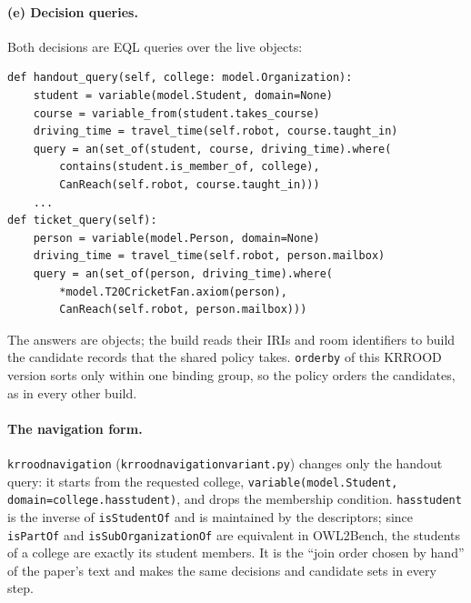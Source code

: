 \documentclass[10pt]{article}
\newcommand{\brkunderscore}{\textunderscore\allowbreak}
\newcommand{\code}[1]{{\let\_\brkunderscore\texttt{#1}}}
\newcommand{\file}[1]{{\let\_\brkunderscore\texttt{#1}}}
\begin{document}
\paragraph{(e) Decision queries.} Both decisions are EQL queries over the live objects:
\begin{lstlisting}[style=py]
def handout_query(self, college: model.Organization):
    student = variable(model.Student, domain=None)
    course = variable_from(student.takes_course)
    driving_time = travel_time(self.robot, course.taught_in)
    query = an(set_of(student, course, driving_time).where(
        contains(student.is_member_of, college),
        CanReach(self.robot, course.taught_in)))
    ...
def ticket_query(self):
    person = variable(model.Person, domain=None)
    driving_time = travel_time(self.robot, person.mailbox)
    query = an(set_of(person, driving_time).where(
        *model.T20CricketFan.axiom(person),
        CanReach(self.robot, person.mailbox)))
\end{lstlisting}
The answers are objects; the build reads their IRIs and room identifiers to build the candidate records that the shared
policy takes. \code{order\_by} of this KRROOD version sorts only within one binding group, so the policy orders the
candidates, as in every other build.

\paragraph{The navigation form.} \code{krrood\_navigation} (\file{krrood\_navigation\_variant.py}) changes only the
handout query: it starts from the requested college, \code{variable(model.Student, domain=college.has\_student)}, and
drops the membership condition. \code{has\_student} is the inverse of \code{isStudentOf} and is maintained by the
descriptors; since \code{isPartOf} and \code{isSubOrganizationOf} are equivalent in OWL2Bench, the students of a college
are exactly its student members. It is the ``join order chosen by hand'' of the paper's text and makes the same decisions
and candidate sets in every step.
\end{document}
